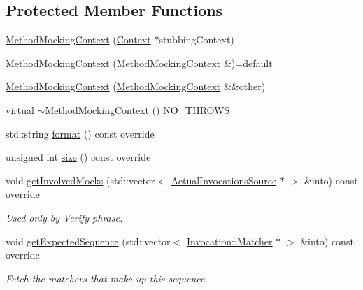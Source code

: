 \subsection*{Protected Member Functions}
\begin{DoxyCompactItemize}
\item 
\mbox{\hyperlink{classfakeit_1_1MethodMockingContext_aa5d0708f0a044fbc8080f64091f8aa71}{Method\+Mocking\+Context}} (\mbox{\hyperlink{structfakeit_1_1MethodMockingContext_1_1Context}{Context}} $\ast$stubbing\+Context)
\item 
\mbox{\hyperlink{classfakeit_1_1MethodMockingContext_aff21ad1769db1e3f81decc54c4b43ed3}{Method\+Mocking\+Context}} (\mbox{\hyperlink{classfakeit_1_1MethodMockingContext}{Method\+Mocking\+Context}} \&)=default
\item 
\mbox{\hyperlink{classfakeit_1_1MethodMockingContext_af4dcf1f0a24f7cedd1d4c5ee23d1a313}{Method\+Mocking\+Context}} (\mbox{\hyperlink{classfakeit_1_1MethodMockingContext}{Method\+Mocking\+Context}} \&\&other)
\item 
virtual \mbox{\hyperlink{classfakeit_1_1MethodMockingContext_a92068a8b1affe1c7be6eafc12297c8c2}{$\sim$\+Method\+Mocking\+Context}} () N\+O\+\_\+\+T\+H\+R\+O\+WS
\item 
std\+::string \mbox{\hyperlink{classfakeit_1_1MethodMockingContext_a0e71b77ab7f91d629a5853542d48624a}{format}} () const override
\item 
unsigned int \mbox{\hyperlink{classfakeit_1_1MethodMockingContext_a47e66f1a704bad7681f70a3e612d08a6}{size}} () const override
\item 
void \mbox{\hyperlink{classfakeit_1_1MethodMockingContext_ac66ba7b51a3c845b8fe8f2fa0f5f5ff0}{get\+Involved\+Mocks}} (std\+::vector$<$ \mbox{\hyperlink{structfakeit_1_1ActualInvocationsSource}{Actual\+Invocations\+Source}} $\ast$ $>$ \&into) const override
\begin{DoxyCompactList}\small\item\em Used only by Verify phrase. \end{DoxyCompactList}\item 
void \mbox{\hyperlink{classfakeit_1_1MethodMockingContext_ab88d912b17801968fab8443079e2eabc}{get\+Expected\+Sequence}} (std\+::vector$<$ \mbox{\hyperlink{structfakeit_1_1Invocation_1_1Matcher}{Invocation\+::\+Matcher}} $\ast$ $>$ \&into) const override
\begin{DoxyCompactList}\small\item\em Fetch the matchers that make-\/up this sequence. \end{DoxyCompactList}\item 

\end{DoxyCompactItemize}

